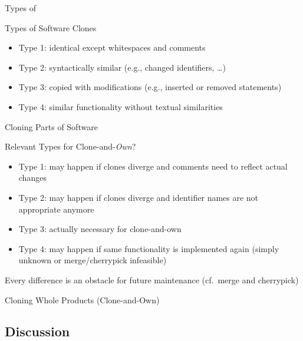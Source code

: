 \begin{frame}[b]{Types of \myframetitle}
	\begin{fancycolumns}[b,height=\textheightwithtitle]
		\begin{definition}{Types of Software Clones}
			\begin{itemize}
			\item Type 1: identical except whitespaces and comments
			\item Type 2: syntactically similar (e.g., changed identifiers, \ldots)
			\item Type 3: copied with modifications (e.g., inserted or removed statements)
			\item Type 4: similar functionality without textual similarities
			\end{itemize}
		\end{definition}
		\begin{example}{Cloning Parts of Software}
			~\hfill{}\hfill{}\hfill~
		\end{example}
	\nextcolumn
		\begin{note}{Relevant Types for Clone-and-\emph{Own}?}
			\begin{itemize}
			\item Type 1: may happen if clones diverge and comments need to reflect actual changes
			\item Type 2: may happen if clones diverge and identifier names are not appropriate anymore
			\item Type 3: actually necessary for clone-and-own
			\item Type 4: may happen if same functionality is implemented again (simply unknown or merge/cherrypick infeasible) 
			\end{itemize}
			Every difference is an obstacle for future maintenance (cf.\ merge and cherrypick)
		\end{note}
		\begin{example}{Cloning Whole Products (Clone-and-Own)}
			~\hfill{}\hfill{}\hfill~
		\end{example}
	\end{fancycolumns}
\end{frame}

\subsection{Discussion}

